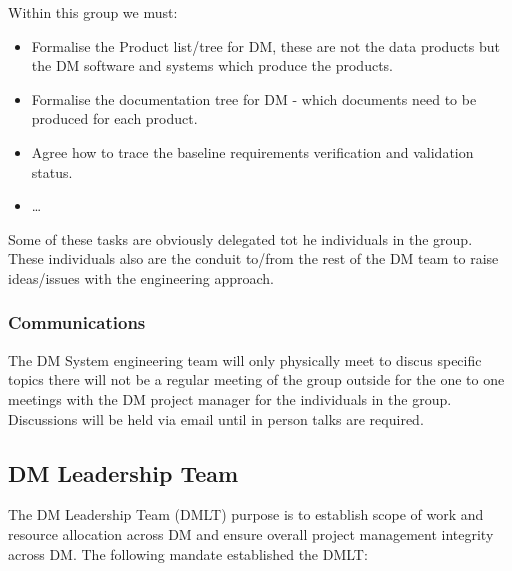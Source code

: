 Within this  group we must:
\begin{itemize}
\item Formalise the Product list/tree for DM, these are not the data products but the DM software and systems which produce the products. 
\item Formalise the documentation tree for DM - which documents need to be produced for each product. 
\item Agree how to trace the baseline requirements verification and validation status.
\item  \ldots
\end{itemize}
 Some of these tasks are obviously delegated tot he individuals in the group. These individuals also are the conduit to/from the rest of the DM team to raise ideas/issues with the engineering approach. 

 \subsubsection{Communications} 
 The DM System engineering team will only physically meet to discus specific topics there will not be a regular meeting of the group outside for the one to one meetings with the DM project manager for the individuals in the group. 
Discussions will be held via email until in person talks are required. 

\subsection{DM Leadership Team} \label{sect:dmlt}

The DM Leadership Team (DMLT) purpose is to establish scope of work and resource allocation across DM and ensure overall project management integrity across DM.
The following mandate established the DMLT:

